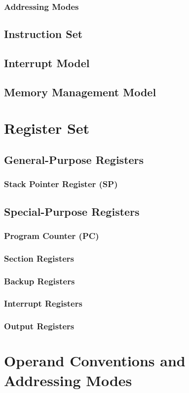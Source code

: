 \documentclass[twoside,a4paper]{memoir}
\begin{document}
\subsection{Addressing Modes}
\section{Instruction Set}
\section{Interrupt Model}
\section{Memory Management Model}

\chapter{Register Set}
\section{General-Purpose Registers}
\subsection{Stack Pointer Register (SP)}
\section{Special-Purpose Registers}
\subsection{Program Counter (PC)}
\subsection{Section Registers}
\subsection{Backup Registers}
\subsection{Interrupt Registers}
\subsection{Output Registers}

\chapter{Operand Conventions and Addressing Modes}
\end{document}
